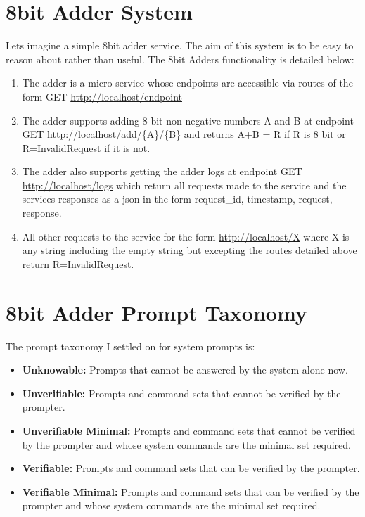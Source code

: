 \documentclass[12pt,a4paper]{article}
\begin{document}
\section{8bit Adder System}

Lets imagine a simple 8bit adder service. The aim of this system is to be easy to reason about rather than useful. The 8bit Adders functionality is detailed below:

\begin{enumerate}
\item The adder is a micro service whose endpoints are accessible via routes of the form GET \url{http://localhost/endpoint}

\item The adder supports adding 8 bit non-negative numbers A and B at endpoint GET \url{http://localhost/add/{A}/{B}} and returns A+B = R if R is 8 bit or R=InvalidRequest if it is not.

\item The adder also supports getting the adder logs at endpoint GET \url{http://localhost/logs} which return all requests made to the service and the services responses as a json in the form {request\_id, timestamp, request, response}.

\item All other requests to the service for the form \url{http://localhost/X} where X is any string including the empty string but excepting the routes detailed above return R=InvalidRequest.
\end{enumerate}

\section{8bit Adder Prompt Taxonomy}

The prompt taxonomy I settled on for system prompts is:
\begin{itemize}
\item \textbf{Unknowable:} Prompts that cannot be answered by the system alone now.
\item \textbf{Unverifiable:} Prompts and command sets that cannot be verified by the prompter.
\item \textbf{Unverifiable Minimal:} Prompts and command sets that cannot be verified by the prompter and whose system commands are the minimal set required.
\item \textbf{Verifiable:} Prompts and command sets that can be verified by the prompter.
\item \textbf{Verifiable Minimal:} Prompts and command sets that can be verified by the prompter and whose system commands are the minimal set required.
\end{itemize}
\end{document}
